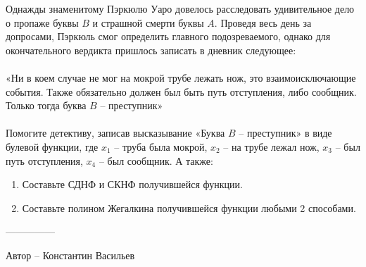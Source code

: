 \question
Однажды знаменитому Пэркюлю Уаро довелось расследовать удивительное дело о пропаже буквы $B$ и страшной смерти буквы $A$. Проведя весь день за допросами, Пэркюль смог определить главного подозреваемого, однако для окончательного вердикта пришлось записать в дневник следующее:
\\
\\
«Ни в коем случае не мог на мокрой трубе лежать нож, это взаимоисключающие события. Также обязательно должен был быть путь отступления, либо сообщник. Только тогда буква $B$ – преступник»
\\
\\
Помогите детективу, записав высказывание «Буква $B$ – преступник» в виде булевой функции, где $x_1$ – труба была мокрой, $x_2$ – на трубе лежал нож, $x_3$ – был путь отступления, $x_4$ – был сообщник. А также:
\begin{enumerate}
    \item Составьте СДНФ и СКНФ получившейся функции.
    \item Составьте полином Жегалкина получившейся функции любыми 2 способами.
\end{enumerate}

---------------

Автор -- Константин Васильев